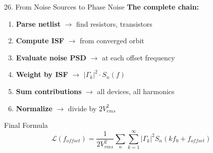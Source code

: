 \documentclass[aspectratio=169, 11pt]{beamer}
\begin{document}
\begin{frame}{26. From Noise Sources to Phase Noise}
    \textbf{The complete chain:}

    \vspace{0.5em}
    \begin{enumerate}
        \item \textbf{Parse netlist} $\rightarrow$ find resistors, transistors
        \item \textbf{Compute ISF} $\rightarrow$ from converged orbit
        \item \textbf{Evaluate noise PSD} $\rightarrow$ at each offset frequency
        \item \textbf{Weight by ISF} $\rightarrow$ $|\Gamma_k|^2 \cdot S_n(f)$
        \item \textbf{Sum contributions} $\rightarrow$ all devices, all harmonics
        \item \textbf{Normalize} $\rightarrow$ divide by $2V_{rms}^2$
    \end{enumerate}

    \vspace{0.5em}
    \begin{block}{Final Formula}
        \[ \mathcal{L}(f_{offset}) = \frac{1}{2V_{rms}^2} \sum_{n} \sum_{k=1}^{\infty} |\Gamma_k|^2 S_n(k f_0 + f_{offset}) \]
    \end{block}
\end{frame}
\end{document}
